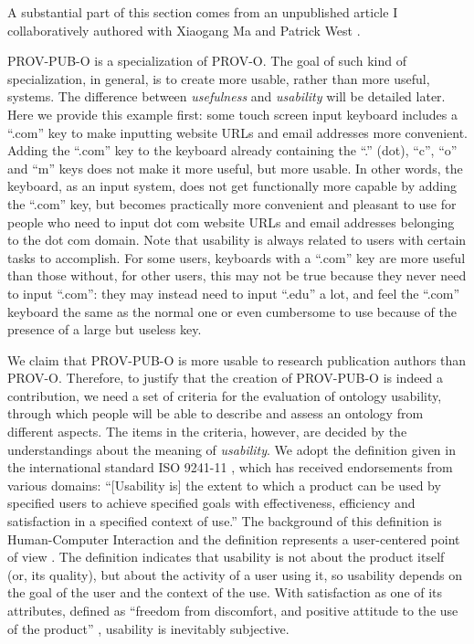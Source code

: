 A substantial part of this section comes from an unpublished article I collaboratively authored with Xiaogang Ma and Patrick West \cite{fu2015ontology}.

PROV-PUB-O is a specialization of PROV-O. The goal of such kind of specialization, in general, is to create more usable, rather than more useful, systems. The difference between {\em usefulness} and {\em usability} will be detailed later. Here we provide this example first: some touch screen input keyboard includes a ``.com'' key to make inputting website URLs and email addresses more convenient. Adding the ``.com'' key to the keyboard already containing the ``.'' (dot), ``c'', ``o'' and ``m'' keys does not make it more useful, but more usable. In other words, the keyboard, as an input system, does not get functionally more capable by adding the ``.com'' key, but becomes practically more convenient and pleasant to use for people who need to input dot com website URLs and email addresses belonging to the dot com domain. Note that usability is always related to users with certain tasks to accomplish. For some users, keyboards with a ``.com'' key are more useful than those without, for other users, this may not be true because they never need to input ``.com'': they may instead need to input ``.edu'' a lot, and feel the ``.com'' keyboard the same as the normal one or even cumbersome to use because of the presence of a large but useless key.

We claim that PROV-PUB-O is more usable to research publication authors than PROV-O. Therefore, to justify that the creation of PROV-PUB-O is indeed a contribution, we need a set of criteria for the evaluation of ontology usability, through which people will be able to describe and assess an ontology from different aspects. The items in the criteria, however, are decided by the understandings about the meaning of \emph{usability}. We adopt the definition given in the international standard ISO 9241-11 \cite{iso19989241}, which has received endorsements from various domains: ``[Usability is] the extent to which a product can be used by specified users to achieve specified goals with effectiveness, efficiency and satisfaction in a specified context of use.'' The background of this definition is Human-Computer Interaction and the definition represents a user-centered point of view \cite{jokela2003standard}. The definition indicates that usability is not about the product itself (or, its quality), but about the activity of a user using it, so usability depends on the goal of the user and the context of the use. With satisfaction as one of its attributes, defined as ``freedom from discomfort, and positive attitude to the use of the product'' \cite{iso19989241}, usability is inevitably subjective.

